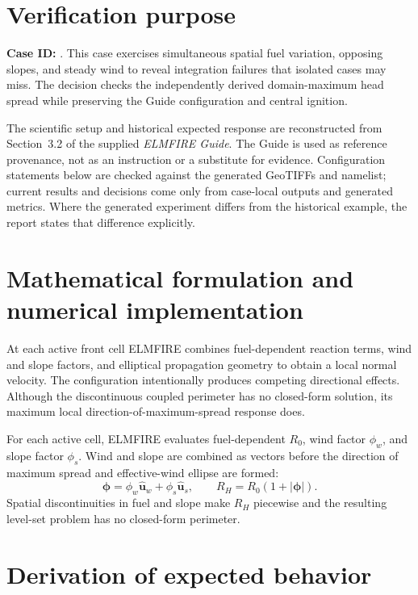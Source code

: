 \section{Verification purpose}

\textbf{Case ID:} \texttt{\CaseID}. This case exercises simultaneous spatial fuel variation, opposing slopes, and steady wind to reveal integration failures that isolated cases may miss. The decision checks the independently derived domain-maximum head spread while preserving the Guide configuration and central ignition.

The scientific setup and historical expected response are reconstructed from Section~3.2 of the supplied \emph{ELMFIRE Guide}. The Guide is used as reference provenance, not as an instruction or a substitute for evidence. Configuration statements below are checked against the generated GeoTIFFs and namelist; current results and decisions come only from case-local outputs and generated metrics. Where the generated experiment differs from the historical example, the report states that difference explicitly.

\section{Mathematical formulation and numerical implementation}

At each active front cell ELMFIRE combines fuel-dependent reaction terms, wind and slope factors, and elliptical propagation geometry to obtain a local normal velocity. The configuration intentionally produces competing directional effects. Although the discontinuous coupled perimeter has no closed-form solution, its maximum local direction-of-maximum-spread response does.

For each active cell, ELMFIRE evaluates fuel-dependent \(R_0\), wind factor \(\phi_w\), and slope factor \(\phi_s\). Wind and slope are combined as vectors before the direction of maximum spread and effective-wind ellipse are formed:
\begin{equation}
\boldsymbol{\phi}=\phi_w\widehat{\boldsymbol{u}}_w+\phi_s\widehat{\boldsymbol{u}}_s, \qquad R_H=R_0(1+|\boldsymbol{\phi}|).
\end{equation}
Spatial discontinuities in fuel and slope make \(R_H\) piecewise and the resulting level-set problem has no closed-form perimeter.

\section{Derivation of expected behavior}

